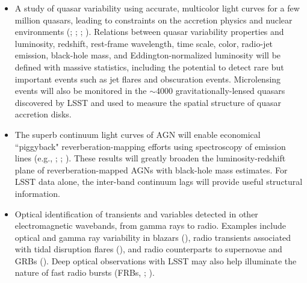\begin{itemize}
\item A study of quasar variability using accurate, multicolor light
  curves for a few million
quasars, leading to constraints on the accretion physics and nuclear environments (\cite{deVries2003};
\cite{VandenBerk2004}; \cite{MacLeod2010}; \cite{Jiang2017}). Relations between quasar variability
      properties and luminosity, redshift,
      rest-frame wavelength, time scale, color, radio-jet emission, black-hole
      mass, and Eddington-normalized luminosity will be defined with massive
      statistics, including the potential to detect rare but important events such as
      jet flares and obscuration events. Microlensing events will also be monitored in the $\sim$4000 gravitationally-lensed
      quasars discovered by LSST and used to measure the spatial structure of quasar accretion disks.

\item The superb continuum light curves of AGN will enable economical ``piggyback"
      reverberation-mapping efforts using spectroscopy of emission lines (e.g., \cite{Doron2012};
      \cite{Shen2015}; \cite{Grier2017}). These results
      will greatly broaden the luminosity-redshift plane of reverberation-mapped AGNs
      with black-hole mass estimates. For LSST data alone, the inter-band continuum lags
      will provide useful structural information.

\item Optical identification of transients and variables detected in
  other electromagnetic wavebands, from gamma rays to radio. Examples
  include optical and gamma ray variability in blazars (\cite{Hovatta2014}),
  radio transients associated with tidal disruption flares
  (\cite{Giannios2011}), and radio counterparts to supernovae and
  GRBs (\cite{GalYam2006}). Deep optical observations with LSST may
  also help illuminate the nature of fast radio bursts (FRBs, \cite{Lorimer2007}; \cite{Thornton2013}).


\end{itemize}
